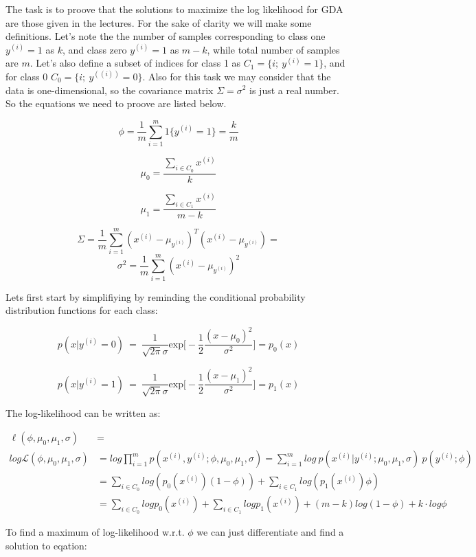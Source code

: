 \documentclass{article}
\begin{document}
The task is to proove that the solutions to maximize the log likelihood for GDA are those given in the
lectures. For the sake of clarity we will make some definitions. Let's note the the number of samples
corresponding to class one $y^{(i)} = 1$ as $k$, and class zero $y^{(i)} = 1$ as $m - k$, while total
number of samples are $m$. Let's also define a subset of indices for class 1 as $C_1 = \{ i; \ y^{(i)} =1 \}$,
and for class 0 $C_0 = \{ i; \ y^((i)) = 0 \}$. Also for this task we may consider that the data
is one-dimensional, so the covariance matrix $\Sigma = \sigma^2$ is just a real number. So the equations we
need to proove are listed below.

\[
\phi  =  \frac1m \sum^{m}_{i=1} 1\{ y^{(i)} =1 \} = \frac km
\]

\[
\mu_0 = \frac{\sum\limits_{i \in C_0} x^{(i)} } {k}
\]

\[
\mu_1 = \frac{\sum\limits_{i \in C_1} x^{(i)} } {m - k} 
\]

$$
\Sigma =
\frac1m \sum_{i=1}^m (x^{(i)} - \mu_{y^{(i)}})^T (x^{(i)} - \mu_{y^{(i)}}) =
$$
$$
\sigma^2 = \frac1m \sum_{i=1}^m (x^{(i)} - \mu_{y^{(i)}})^2
$$

Lets first start by simplifiying by reminding the conditional probability distribution functions for each class:

\[
p(x|y^{(i)} = 0) \ = \ \frac 1{\sqrt{2\pi}\sigma} \text{exp} \Big [-\frac12 \frac{(x - \mu_0)^2} {\sigma^2} \Big ] = p_0(x)
\]

\[
p(x | y^{(i)} = 1) \ = \ \frac 1{\sqrt{2\pi}\sigma} \text{exp} 
\Big [-\frac12 \frac{(x - \mu_1)^2} {\sigma^2} \Big ] = p_1(x)
\]


The log-likelihood can be written as:

\begin{align*}
\ell(\phi, \mu_0, \mu_1, \sigma) &= \\
log \mathcal{L}(\phi, \mu_0, \mu_1, \sigma) &= 
log\prod_{i=1}^{m} p(x^{(i)},y^{(i)}; \phi, \mu_0, \mu_1, \sigma)
= \sum_{i=1}^{m} log \ p(x^{(i)}|y^{(i)}; \mu_0, \mu_1, \sigma) \ p(y^{(i)};\phi) \\
&= \sum_{i \in C_0}log (p_0(x^{(i)})(1-\phi)) + \sum_{i \in C_1}log (p_1(x^{(i)})\phi) \\
&= \sum_{i \in C_0}log p_0(x^{(i)}) + \sum_{i \in C_1}log p_1(x^{(i)})
 + (m - k)log(1 - \phi) + k \cdot log\phi
\end{align*}

To find a maximum of log-likelihood w.r.t. $\phi$ we can just differentiate and find a solution to eqation:
\end{document}
